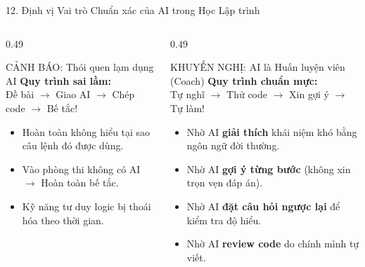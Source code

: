 \documentclass[aspectratio=169, 10pt]{beamer}
\begin{document}
\begin{frame}{12. Định vị Vai trò Chuẩn xác của AI trong Học Lập trình}
  \begin{columns}[T]
    \begin{column}{0.49\textwidth}
      \begin{cbox}[accentorange]{CẢNH BÁO: Thói quen lạm dụng AI}
        \footnotesize
        \textbf{Quy trình sai lầm:}\\
        Đề bài $\rightarrow$ Giao AI $\rightarrow$ Chép code $\rightarrow$ Bế tắc!
        \vspace{2pt}
        \begin{itemize}\setlength{\itemsep}{2pt}
          \item Hoàn toàn không hiểu tại sao câu lệnh đó được dùng.
          \item Vào phòng thi không có AI $\rightarrow$ Hoàn toàn bế tắc.
          \item Kỹ năng tư duy logic bị thoái hóa theo thời gian.
        \end{itemize}
      \end{cbox}
    \end{column}
    \begin{column}{0.49\textwidth}
      \begin{cbox}[secondarygreen]{KHUYẾN NGHỊ: AI là Huấn luyện viên (Coach)}
        \footnotesize
        \textbf{Quy trình chuẩn mực:}\\
        Tự nghĩ $\rightarrow$ Thử code $\rightarrow$ Xin gợi ý $\rightarrow$ Tự làm!
        \vspace{2pt}
        \begin{itemize}\setlength{\itemsep}{2pt}
          \item Nhờ AI \textbf{giải thích} khái niệm khó bằng ngôn ngữ đời thường.
          \item Nhờ AI \textbf{gợi ý từng bước} (không xin trọn vẹn đáp án).
          \item Nhờ AI \textbf{đặt câu hỏi ngược lại} để kiểm tra độ hiểu.
          \item Nhờ AI \textbf{review code} do chính mình tự viết.
        \end{itemize}
      \end{cbox}
    \end{column}
  \end{columns}
\end{frame}
\end{document}
